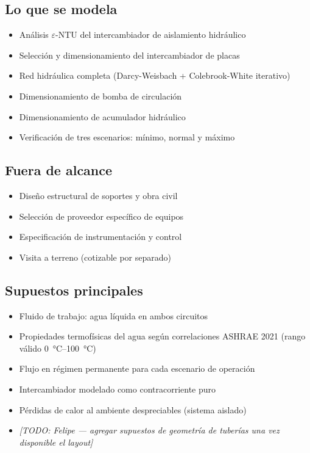 \documentclass[12pt, letterpaper]{article}
\begin{document}
\subsection{Lo que se modela}
\begin{itemize}
  \item Análisis $\varepsilon$-NTU del intercambiador de aislamiento hidráulico
  \item Selección y dimensionamiento del intercambiador de placas
  \item Red hidráulica completa (Darcy-Weisbach + Colebrook-White iterativo)
  \item Dimensionamiento de bomba de circulación
  \item Dimensionamiento de acumulador hidráulico
  \item Verificación de tres escenarios: mínimo, normal y máximo
\end{itemize}

\subsection{Fuera de alcance}
\begin{itemize}
  \item Diseño estructural de soportes y obra civil
  \item Selección de proveedor específico de equipos
  \item Especificación de instrumentación y control
  \item Visita a terreno (cotizable por separado)
\end{itemize}

\subsection{Supuestos principales}
\begin{itemize}
  \item Fluido de trabajo: agua líquida en ambos circuitos
  \item Propiedades termofísicas del agua según correlaciones ASHRAE 2021
        (rango válido \SI{0}{\degreeCelsius}--\SI{100}{\degreeCelsius})
  \item Flujo en régimen permanente para cada escenario de operación
  \item Intercambiador modelado como contracorriente puro
  \item Pérdidas de calor al ambiente despreciables (sistema aislado)
  \item \textit{[TODO: Felipe --- agregar supuestos de geometría de tuberías
        una vez disponible el layout]}
\end{itemize}
\end{document}
